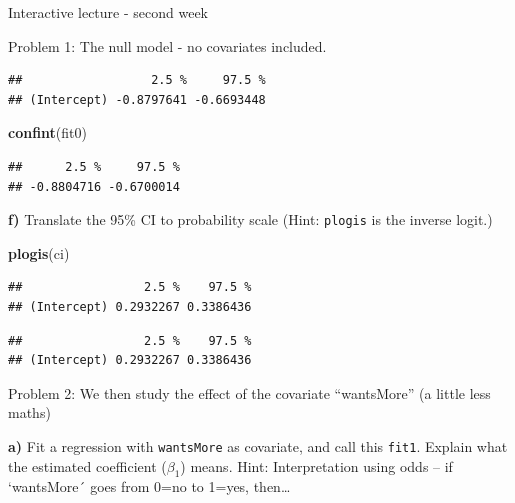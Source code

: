 \documentclass[
  ignorenonframetext,
]{beamer}
\newenvironment{Shaded}{\begin{snugshade}}{\end{snugshade}}
\newcommand{\FunctionTok}[1]{\textcolor[rgb]{0.13,0.29,0.53}{\textbf{#1}}}
\newcommand{\NormalTok}[1]{#1}
\newcommand{\SpecialCharTok}[1]{\textcolor[rgb]{0.81,0.36,0.00}{\textbf{#1}}}
\begin{document}
\begin{frame}[fragile]{Interactive lecture - second week}
\begin{block}{Problem 1: The null model - no covariates included.}
\begin{verbatim}
##                  2.5 %     97.5 %
## (Intercept) -0.8797641 -0.6693448
\end{verbatim}

\begin{Shaded}
\begin{Highlighting}[]
\FunctionTok{confint}\NormalTok{(fit0)}
\end{Highlighting}
\end{Shaded}

\begin{verbatim}
##      2.5 %     97.5 % 
## -0.8804716 -0.6700014
\end{verbatim}

\textbf{f)} Translate the 95\% CI to probability scale (Hint:
\texttt{plogis} is the inverse logit.)

\begin{Shaded}
\begin{Highlighting}[]
\FunctionTok{plogis}\NormalTok{(ci)}
\end{Highlighting}
\end{Shaded}

\begin{verbatim}
##                 2.5 %    97.5 %
## (Intercept) 0.2932267 0.3386436
\end{verbatim}

\begin{Shaded}
\end{Shaded}

\begin{verbatim}
##                 2.5 %    97.5 %
## (Intercept) 0.2932267 0.3386436
\end{verbatim}
\end{block}

\begin{block}{Problem 2: We then study the effect of the covariate
``wantsMore''}
\protect\hypertarget{problem-2-we-then-study-the-effect-of-the-covariate-wantsmore}{}
(a little less maths)

\textbf{a)} Fit a regression with \texttt{wantsMore} as covariate, and
call this \texttt{fit1}. Explain what the estimated coefficient
(\(\beta_1\)) means. Hint: Interpretation using odds -- if `wantsMore´
goes from 0=no to 1=yes, then\ldots{}


\end{block}
\end{frame}
\end{document}
